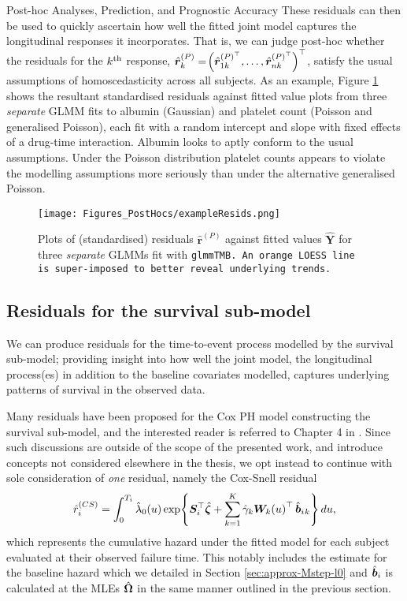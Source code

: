 \begin{chapter}{\label{cha:posthoc}Post-hoc Analyses, Prediction, and Prognostic Accuracy}
These residuals can then be used to quickly ascertain how well the fitted joint model captures the longitudinal responses it incorporates. That is, we can judge post-hoc whether the residuals for the $k^{\text{th}}$ response, $\hat{\bm{r}}_k^{(P)}=\!\left(\hat{\bm{r}}_{1k}^{(P)^\top},\dots,\hat{\bm{r}}_{nk}^{(P)^\top}\right)^\top$, satisfy the usual assumptions of \eg homoscedasticity across all subjects. As an example, Figure \ref{fig:posthocs-example-residuals} shows the resultant  standardised residuals against fitted value plots from three \textit{separate} GLMM fits to albumin (Gaussian) and platelet count (Poisson and generalised Poisson), each fit with a random intercept and slope with fixed effects of a drug-time interaction. Albumin looks to aptly conform to the usual assumptions. Under the Poisson distribution platelet counts appears to violate the modelling assumptions more seriously than under the alternative generalised Poisson.

\begin{figure}
    \centering
    \texttt{[image: Figures\_PostHocs/exampleResids.png]}
    \caption{Plots of (standardised) residuals $\hat{\bm{r}}^{(P)}$ against fitted values $\hat{\bm{Y}}$ for three \textit{separate} GLMMs fit with \tt{glmmTMB}. An orange LOESS line is super-imposed to better reveal underlying trends.}
    \label{fig:posthocs-example-residuals}
\end{figure}

\subsection{Residuals for the survival sub-model}\label{sec:posthocs-residuals-surv}
We can produce residuals for the time-to-event process modelled by the survival sub-model; providing insight into how well the joint model, \ie the longitudinal process(es) in addition to the baseline covariates modelled, captures underlying patterns of survival in the observed data.

Many residuals have been proposed for the Cox PH model constructing the survival sub-model, and the interested reader is referred to Chapter 4 in \citet{Therneau2000}. Since such discussions are outside of the scope of the presented work, and introduce concepts not considered elsewhere in the thesis, we opt instead to continue with sole consideration of \textit{one} residual, namely the Cox-Snell residual \citep{CoxSnell1968}
\begin{align}
    \hat{r}_i^{(CS)} = \int_0^{T_i}\hat{\lambda}_0\!\left( u\right)\exp\!\left\{\bm{S}_i^\top\hat{\bm{\zeta}}+\sum_{k=1}^K\hat{\gamma}_k\bm{W}_k\!\left( u \right)^\top\hat{\bm{b}}_i{_k}\right\} du,
\label{eq:posthocs-residuals-coxsnell}    
\end{align}
which represents the cumulative hazard under the fitted model for each subject evaluated at their observed failure time. This notably includes the estimate for the baseline hazard which we detailed in Section \ref{sec:approx-Mstep-l0} and $\hat{\bm{b}}_i$ is calculated at the MLEs $\hat{\bm{\Omega}}$ in the same manner outlined in the previous section.


\end{chapter}
